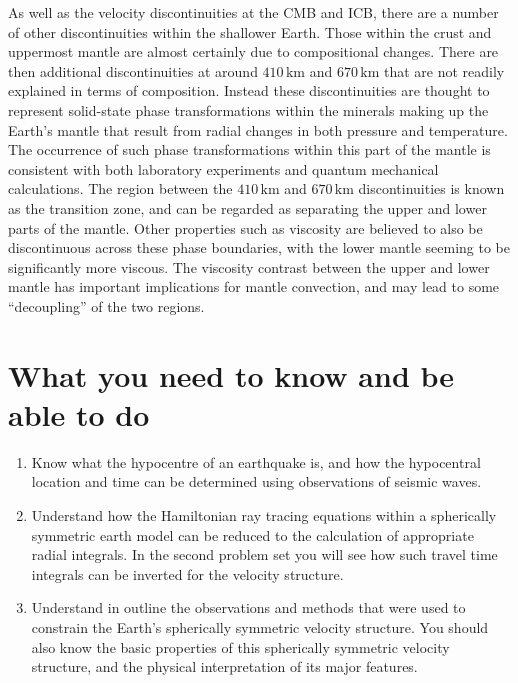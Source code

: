 As well as the velocity discontinuities at the CMB and ICB, there are a number of other discontinuities within the shallower Earth. Those within the crust and uppermost mantle 
are almost certainly due to compositional changes. There are then additional discontinuities at around $410\,\mathrm{km}$ and $670\,\mathrm{km}$ that are not readily explained in terms of composition. 
Instead these discontinuities are thought to represent solid-state phase transformations within the minerals making up the Earth's mantle that result from radial changes in both 
pressure and temperature. The occurrence of such phase transformations within this part of the mantle is consistent with both laboratory experiments and quantum mechanical calculations. 
The region between the $410\,\mathrm{km}$ and $670\,\mathrm{km}$ discontinuities is known as the transition zone, and can be regarded as separating the upper and lower parts of the mantle. Other 
properties such as viscosity are believed to also be discontinuous across these phase boundaries, with the lower mantle seeming to be significantly more viscous. The 
viscosity contrast between the upper and lower mantle has important implications for mantle convection, and may lead to some ``decoupling'' of the two regions.

\section*{What you need to know and be able to do}
\begin{enumerate}
    \item[(i)] Know what the hypocentre of an earthquake is, and how the hypocentral location and time can be determined using observations of seismic waves.
    \item[(ii)] Understand how the Hamiltonian ray tracing equations within a spherically symmetric earth model can be reduced to the calculation of 
    appropriate radial integrals. In the second problem set you will see how such travel time integrals can be inverted for the velocity structure.
    \item[(iii)] Understand in outline the observations and methods that were used to constrain the Earth's spherically symmetric velocity structure. 
    You should also know the basic properties of this spherically symmetric velocity structure, and the physical interpretation of its major features.
\end{enumerate}
